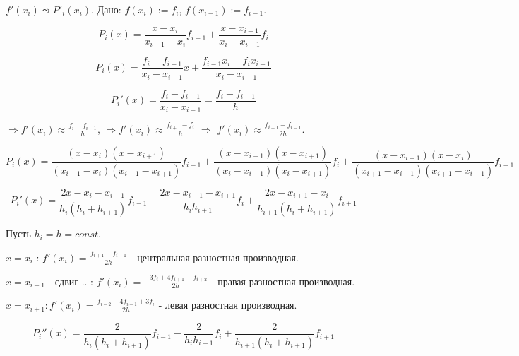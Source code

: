 $ f'(x_i) \leadsto P'_i(x_i) $.
Дано: $ f(x_i) := f_i $, $ f(x_{i-1}) := f_{i-1} $.

\begin{equation}
    P_i(x) = \frac{x - x_i}{x_{i-1} - x_i} f_{i-1} + \frac{x - x_{i-1}}{x_i - x_{i-1}} f_i
\end{equation}

\begin{equation}
    P_i(x) = \frac{f_i - f_{i-1}}{x_i - x_{i-1}} x + \frac{f_{i-1} x_i - f_i x_{i-1}}{x_i - x_{i-1}}
\end{equation}

\begin{equation}
    P_i'(x) = \frac{f_i - f_{i-1}}{x_i - x_{i-1}} = \frac{f_i - f_{i-1}}{h}
\end{equation}

$ \Rightarrow f'(x_i) \approx \frac{f_i - f_{i-1}}{h} $, 
$ \Rightarrow f'(x_i) \approx \frac{f_{i+1} - f_i}{h} $ $\Rightarrow$ 
$ f'(x_i) \approx \frac{f_{i+1} - f_{i-1}}{2h} $.

\begin{equation}
    P_i(x) = \frac{(x - x_i)(x - x_{i+1})}{(x_{i-1} - x_i)(x_{i-1} - x_{i+1})} f_{i-1} + 
        \frac{(x - x_{i-1})(x - x_{i+1})}{(x_i - x_{i-1})(x_i - x_{i+1})} f_i + 
        \frac{(x - x_{i-1})(x - x_i)}{(x_{i+1} - x_{i-1})(x_{i+1} - x_{i-1})} f_{i+1}
\end{equation}

\begin{equation}
    P_i'(x) = \frac{2x - x_i - x_{i+1}}{h_i(h_i + h_{i+1})} f_{i-1} -
        \frac{2x - x_{i-1} - x_{i+1}}{h_i h_{i+1}} f_i + 
        \frac{2x - x_{i+1} - x_i}{h_{i+1}(h_i + h_{i+1})} f_{i+1}
\end{equation}

Пусть $ h_i = h = const $. 

$ x = x_i $ : $ f'(x_i) = \frac{f_{i+1} - f_{i-1}}{2h} $ - центральная разностная производная.

$ x = x_{i-1} $ - сдвиг .. : $ f'(x_i) = \frac{- 3 f_i + 4 f_{i+1} - f_{i+2}}{2h} $ - правая разностная производная.

$ x = x_{i+1} : f'(x_i) = \frac{f_{i-2} - 4 f_{i-1} + 3 f_i}{2h} $ - левая разностная производная.

\begin{equation}
    P_i''(x) = \frac{2}{h_i(h_i + h_{i+1})} f_{i-1} -
        \frac{2}{h_i h_{i+1}} f_i + 
        \frac{2}{h_{i+1}(h_i + h_{i+1})} f_{i+1}
\end{equation}

